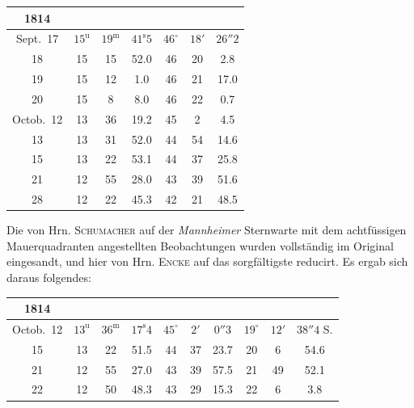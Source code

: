 \begin{center}\fontsize{9}{11}\selectfont\setlength{\tabcolsep}{3pt}\renewcommand{\arraystretch}{1.15}\begin{tabular}{c|ccc|ccc}
1814 &  &  \\
\hline
Sept.\ 17  & $15^{\mathrm u}$ & $19^{\mathrm m}$ & $41^{\mathrm s}5$ & $46^{\circ}$ & $18'$ & $26''2$ \\
18         & 15 & 15 & 52.0 & 46 & 20 & 2.8 \\
19         & 15 & 12 & 1.0  & 46 & 21 & 17.0 \\
20         & 15 & 8  & 8.0  & 46 & 22 & 0.7 \\
Octob.\ 12 & 13 & 36 & 19.2 & 45 & 2  & 4.5 \\
13         & 13 & 31 & 52.0 & 44 & 54 & 14.6 \\
15         & 13 & 22 & 53.1 & 44 & 37 & 25.8 \\
21         & 12 & 55 & 28.0 & 43 & 39 & 51.6 \\
28         & 12 & 22 & 45.3 & 42 & 21 & 48.5 \\
\end{tabular}\end{center}

\par\indent Die von Hrn. \textsc{Schumacher} auf der \emph{Mannheimer} Sternwarte mit dem achtfüssigen
Mauerquadranten angestellten Beobachtungen wurden vollständig im Original eingesandt, und
hier von Hrn. \textsc{Encke} auf das sorgfältigste reducirt. Es ergab sich daraus folgendes:

\begin{center}\fontsize{9}{11}\selectfont\setlength{\tabcolsep}{3pt}\renewcommand{\arraystretch}{1.15}\begin{tabular}{c|ccc|ccc|ccc}
1814 &  &  &  \\
\hline
Octob.\ 12 & $13^{\mathrm u}$ & $36^{\mathrm m}$ & $17^{\mathrm s}4$ & $45^{\circ}$ & $2'$  & $0''3$  & $19^{\circ}$ & $12'$ & $38''4$ S. \\
15         & 13 & 22 & 51.5 & 44 & 37 & 23.7 & 20 & 6  & 54.6 \\
21         & 12 & 55 & 27.0 & 43 & 39 & 57.5 & 21 & 49 & 52.1 \\
22         & 12 & 50 & 48.3 & 43 & 29 & 15.3 & 22 & 6  & 3.8  \\
\end{tabular}\end{center}

